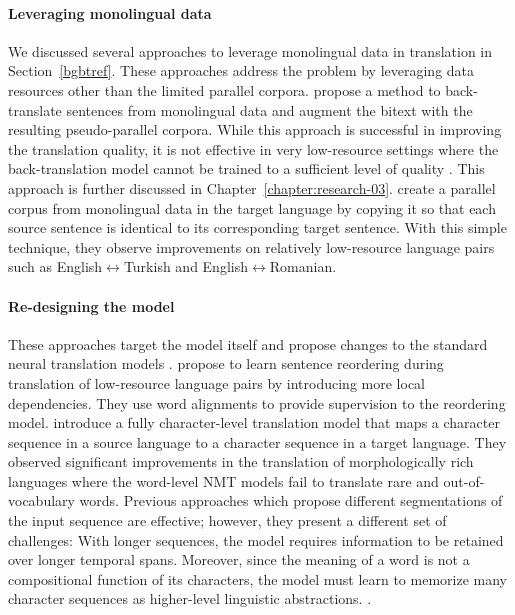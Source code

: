 \paragraph{Leveraging monolingual data} 
We discussed several approaches to leverage monolingual data in translation in Section~\ref{bgbtref}.
These approaches address the problem by leveraging data resources other than the limited parallel corpora. 
\citet{sennrich-haddow-birch:2016:P16-11} propose a method to back-translate sentences from monolingual data and augment the bitext with the resulting pseudo-parallel corpora.  %
While this approach is successful in improving the translation quality, it is not effective in very low-resource settings where the back-translation model cannot be trained to a sufficient level of quality \citep{abdulmumin2020using}.
This approach is further discussed in Chapter~\ref{chapter:research-03}.
\citet{currey2017copied} create a parallel corpus from monolingual data in the target language by copying it so that each source sentence is identical to its corresponding target sentence. With this simple technique, they observe improvements on relatively low-resource language pairs such as English$\leftrightarrow$Turkish and English$\leftrightarrow$Romanian.


\paragraph{Re-designing the model} 
These approaches target the model itself and propose changes to the standard neural translation models \citep{costa-jussa-fonollosa-2016-character,sennrich-haddow-birch:2016:P16-12}.
\citet{ostling2017neural} propose to learn sentence reordering during translation of low-resource language pairs by introducing more local dependencies.
They use word alignments to provide supervision to the reordering model.
\citet{lee-etal-2017-fully} introduce a fully character-level translation model that maps a character sequence in a source language to a character sequence in a target language. 
They observed significant improvements in the translation of morphologically rich languages where the word-level NMT models fail to translate rare and out-of-vocabulary words.
Previous approaches which propose different segmentations of the input sequence are effective; however, they present a different set of challenges:
With longer sequences, the model requires information to be retained over longer temporal spans. 
Moreover, since the meaning of a word is not a compositional function of its characters, the model must learn to memorize many character sequences as higher-level linguistic abstractions. \citep{cherry-etal-2018-revisiting}.

